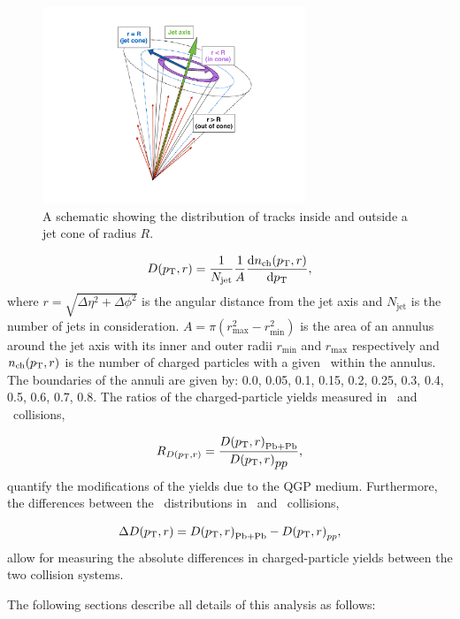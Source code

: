 \begin{figure}[htbp]
\centering
\includegraphics[width=0.7\textwidth]{figures/main/general/cartoon_dptr}
\caption{A schematic showing the distribution of tracks inside and outside a jet cone of radius $R$.}
\label{fig:cartoon_dptr}
\end{figure}


\begin{align}
\mbox{$D( \mbox{$p_{\mathrm{T}}$}, r)$} = \frac{1}{N_{\mathrm{jet}}} \frac{1}{A} \frac{\mathrm{d} n_{\mathrm{ch}} (\mbox{$p_{\mathrm{T}}$}, r)}{\mathrm{d} \mbox{$p_{\mathrm{T}}$}},
\end{align}
where $r = \sqrt{\Delta \eta^2 + \Delta \phi^2}$ is the angular distance from the jet axis and $N_{\mathrm{jet}}$ is the number of jets in consideration.
$A = \pi (r_{\mathrm{max}}^2 - r_{\mathrm{min}}^2) $ is the area of an annulus around the jet axis with its inner and outer radii $r_{\mathrm{min}}$ and $r_{\mathrm{max}}$ respectively and $n_{\mathrm{ch}}(\mbox{$p_{\mathrm{T}}$}, r)$ is the number of charged particles with a given \pt\ within the annulus.
The boundaries of the annuli are given by: 0.0, 0.05, 0.1, 0.15, 0.2, 0.25, 0.3, 0.4, 0.5, 0.6, 0.7, 0.8.
The ratios of the charged-particle yields measured in \pbpb\ and \pp\ collisions,

\begin{align}
   \mbox{$R_{D( p_{\mathrm{T}}, r)}$} = \frac{\mbox{$D( \mbox{$p_{\mathrm{T}}$}, r)$}_\mathrm{Pb+Pb}}{\mbox{$D( \mbox{$p_{\mathrm{T}}$}, r)$}_{\mbox{$pp$}}},
\end{align}
quantify the modifications of the yields due to the QGP medium.
Furthermore, the differences between the \Dptr\ distributions in \pbpb\ and \pp\ collisions, 

\begin{align}
   \Delta \mbox{$D( \mbox{$p_{\mathrm{T}}$}, r)$} = \mbox{$D( \mbox{$p_{\mathrm{T}}$}, r)$}_\mathrm{Pb+Pb} - \mbox{$D( \mbox{$p_{\mathrm{T}}$}, r)$}_{pp},
\end{align}
allow for measuring the absolute differences in charged-particle yields between the two collision systems.

The following sections describe all details of this analysis as follows:

